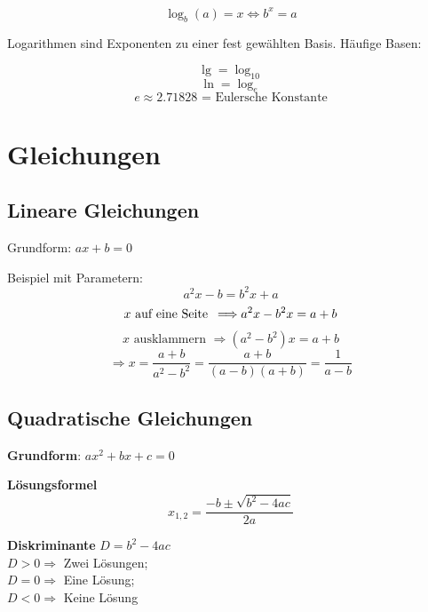 \begin{multicols}{2}
\begin{tcolorbox}[colback=white]
$$\log_b{}(a)=x \Longleftrightarrow{} b^x = a$$
\end{tcolorbox}

Logarithmen sind Exponenten zu einer fest gewählten Basis. Häufige Basen:

$$\lg = \log_{10} $$
$$\ln = \log_e$$
$$e \approx 2.71828 \textrm{ = Eulersche Konstante}$$


\begin{tcolorbox}[colback=white]

\end{tcolorbox}%
%
\RLP{\forceCB{}}%
\keinHeaderUndKeinFooter{}

\section*{Gleichungen}

\subsection*{Lineare Gleichungen}
Grundform: $ax+b=0$

Beispiel mit Parametern:
$$a^2x-b=b^2x+a$$
$$x\textrm{ auf eine Seite\, } \Longrightarrow a^2x -b^2x = a+b$$
$$x\textrm{ ausklammern }\Longrightarrow (a^2-b^2)x= a+b$$
$$\Longrightarrow x= \frac{a+b}{a^2-b^2} = \frac{a+b}{(a-b)(a+b)}=\frac{1}{a-b}$$

\subsection*{Quadratische Gleichungen}

\textbf{Grundform}: $ax^2 + bx+c = 0$

\begin{tcolorbox}[colback=white]
  \textbf{Lösungsformel}
  $$x_{1,2} = \frac{-b \pm \sqrt{b^2-4ac}}{2a}$$
\end{tcolorbox}
\textbf{Diskriminante} $D = b^2-4ac$\\
$D>0\Longrightarrow$ Zwei Lösungen;\\
$D=0\Longrightarrow$ Eine Lösung;\\
$D<0\Longrightarrow$ Keine Lösung


\end{multicols}
